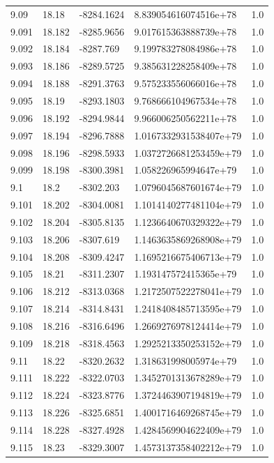 \begin{tabular}{lllll}
9.09 & 18.18 & -8284.1624 & 8.839054616074516e+78 & 1.0 \\
9.091 & 18.182 & -8285.9656 & 9.017615363888739e+78 & 1.0 \\
9.092 & 18.184 & -8287.769 & 9.199783278084986e+78 & 1.0 \\
9.093 & 18.186 & -8289.5725 & 9.385631228258409e+78 & 1.0 \\
9.094 & 18.188 & -8291.3763 & 9.575233556066016e+78 & 1.0 \\
9.095 & 18.19 & -8293.1803 & 9.768666104967534e+78 & 1.0 \\
9.096 & 18.192 & -8294.9844 & 9.966006250562211e+78 & 1.0 \\
9.097 & 18.194 & -8296.7888 & 1.0167332931538407e+79 & 1.0 \\
9.098 & 18.196 & -8298.5933 & 1.0372726681253459e+79 & 1.0 \\
9.099 & 18.198 & -8300.3981 & 1.058226965994647e+79 & 1.0 \\
9.1 & 18.2 & -8302.203 & 1.0796045687601674e+79 & 1.0 \\
9.101 & 18.202 & -8304.0081 & 1.1014140277481104e+79 & 1.0 \\
9.102 & 18.204 & -8305.8135 & 1.1236640670329322e+79 & 1.0 \\
9.103 & 18.206 & -8307.619 & 1.1463635869268908e+79 & 1.0 \\
9.104 & 18.208 & -8309.4247 & 1.1695216675406713e+79 & 1.0 \\
9.105 & 18.21 & -8311.2307 & 1.193147572415365e+79 & 1.0 \\
9.106 & 18.212 & -8313.0368 & 1.2172507522278041e+79 & 1.0 \\
9.107 & 18.214 & -8314.8431 & 1.2418408485713595e+79 & 1.0 \\
9.108 & 18.216 & -8316.6496 & 1.2669276978124414e+79 & 1.0 \\
9.109 & 18.218 & -8318.4563 & 1.2925213350253152e+79 & 1.0 \\
9.11 & 18.22 & -8320.2632 & 1.318631998005974e+79 & 1.0 \\
9.111 & 18.222 & -8322.0703 & 1.3452701313678289e+79 & 1.0 \\
9.112 & 18.224 & -8323.8776 & 1.3724463907194819e+79 & 1.0 \\
9.113 & 18.226 & -8325.6851 & 1.4001716469268745e+79 & 1.0 \\
9.114 & 18.228 & -8327.4928 & 1.4284569904622409e+79 & 1.0 \\
9.115 & 18.23 & -8329.3007 & 1.4573137358402212e+79 & 1.0 \\

\end{tabular}

